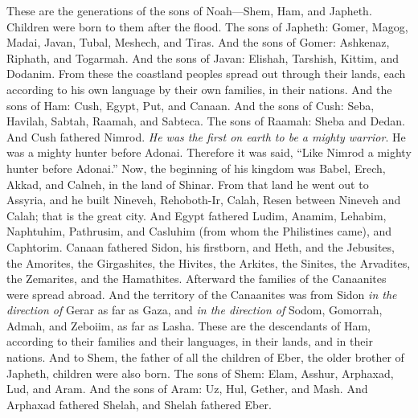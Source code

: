 \begin{biblechapter} %
 These are the generations of the sons of Noah—Shem, Ham, and Japheth. Children were born to them after the flood.
\verse The sons of Japheth: Gomer, Magog, Madai, Javan, Tubal, Meshech, and Tiras.
\verse And the sons of Gomer: Ashkenaz, Riphath, and Togarmah.
\verse And the sons of Javan: Elishah, Tarshish, Kittim, and Dodanim.
\verse From these the coastland peoples spread out through their lands, each according to his own language by their own families, in their nations.
\verse And the sons of Ham: Cush, Egypt, Put, and Canaan.
\verse And the sons of Cush: Seba, Havilah, Sabtah, Raamah, and Sabteca. The sons of Raamah: Sheba and Dedan.
\verse And Cush fathered Nimrod. \textit{He was the first on earth to be a mighty warrior}.
\verse He was a mighty hunter before Adonai. Therefore it was said, “Like Nimrod a mighty hunter before Adonai.”
\verse Now, the beginning of his kingdom was Babel, Erech, Akkad, and Calneh, in the land of Shinar.
\verse From that land he went out to Assyria, and he built Nineveh, Rehoboth-Ir, Calah,
\verse Resen between Nineveh and Calah; that is the great city.
\verse And Egypt fathered Ludim, Anamim, Lehabim, Naphtuhim,
\verse Pathrusim, and Casluhim (from whom the Philistines came), and Caphtorim.
\verse Canaan fathered Sidon, his firstborn, and Heth,
\verse and the Jebusites, the Amorites, the Girgashites,
\verse the Hivites, the Arkites, the Sinites,
\verse the Arvadites, the Zemarites, and the Hamathites. Afterward the families of the Canaanites were spread abroad.
\verse And the territory of the Canaanites was from Sidon \textit{in the direction of} Gerar as far as Gaza, and \textit{in the direction of} Sodom, Gomorrah, Admah, and Zeboiim, as far as Lasha.
\verse These are the descendants of Ham, according to their families and their languages, in their lands, and in their nations.
\verse And to Shem, the father of all the children of Eber, the older brother of Japheth, children were also born.
\verse The sons of Shem: Elam, Asshur, Arphaxad, Lud, and Aram.
\verse And the sons of Aram: Uz, Hul, Gether, and Mash.
\verse And Arphaxad fathered Shelah, and Shelah fathered Eber.

\end{biblechapter}
